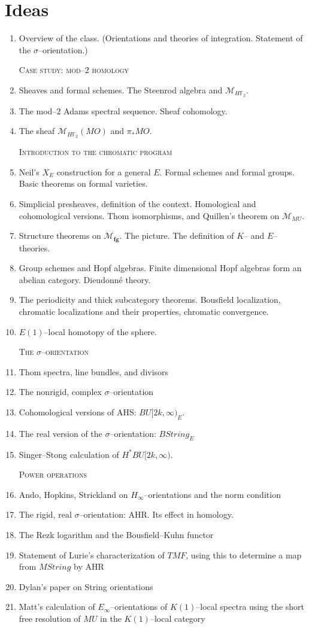 \documentclass{amsart}
\newcommand{\F}{\mathbb F}
\newcommand{\<}{\langle}
\renewcommand{\>}{\rangle}
\newcommand{\context}[1]{\mathcal{M}_{#1}}
\newcommand{\moduli}[1]{\mathcal{M}_{\mathbf{#1}}}
\newcommand{\String}{\mathit{String}}
\newcommand{\TMF}{\mathit{TMF}}
\newcommand{\MU}{\mathit{MU}}
\theoremstyle{plain}
\theoremstyle{definition}
\theoremstyle{remark}
\begin{document}
\section{Ideas}
\begin{enumerate}
\item Overview of the class. (Orientations and theories of integration. Statement of the $\sigma$--orientation.)

\textsc{Case study: mod--$2$ homology}
\item Sheaves and formal schemes. The Steenrod algebra and $\context{H\F_2}$.
\item The mod--$2$ Adams spectral sequence. Sheaf cohomology. 
\item The sheaf $\context{H\F_2}(MO)$ and $\pi_* MO$.

\textsc{Introduction to the chromatic program}

\item Neil's $X_E$ construction for a general $E$. Formal schemes and formal groups. Basic theorems on formal varieties.
\item Simplicial presheaves, definition of the context. Homological and cohomological versions. Thom isomorphisms, and Quillen's theorem on $\context{\MU}$.
\item Structure theorems on $\moduli{fg}$. The picture. The definition of $K$-- and $E$--theories.
\item Group schemes and Hopf algebras. Finite dimensional Hopf algebras form an abelian category. Dieudonn\'e theory.
\item The periodicity and thick subcategory theorems. Bousfield localization, chromatic localizations and their properties, chromatic convergence.
\item $E(1)$--local homotopy of the sphere.

\textsc{The $\sigma$--orientation}

\item Thom spectra, line bundles, and divisors
\item The nonrigid, complex $\sigma$--orientation
\item Cohomological versions of AHS: $BU[2k, \infty)_E$.
\item The real version of the $\sigma$--orientation: $B\String_E$
\item Singer--Stong calculation of $H^* BU[2k, \infty)$.

\textsc{Power operations}

\item Ando, Hopkins, Strickland on $H_\infty$--orientations and the norm condition
\item The rigid, real $\sigma$--orientation: AHR. Its effect in homology.
\item The Rezk logarithm and the Bousfield--Kuhn functor
\item Statement of Lurie's characterization of $\TMF$, using this to determine a map from $M\String$ by AHR
\item Dylan's paper on String orientations
\item Matt's calculation of $E_\infty$--orientations of $K(1)$--local spectra using the short free resolution of $MU$ in the $K(1)$--local category


\end{enumerate}
\end{document}
